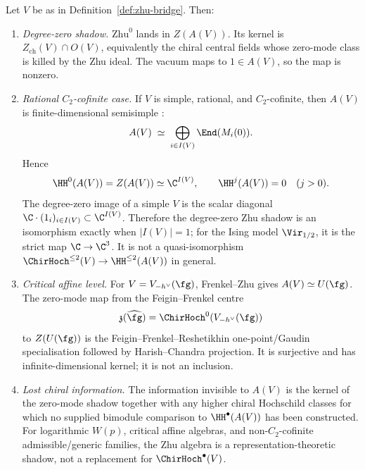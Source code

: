 \begin{proposition}%
\label{prop:zhu-hochschild-comparison}%
%
%
Let $V$ be as in Definition~\ref{def:zhu-bridge}. Then:
\begin{enumerate}
 \item[\textup{(i)}] \emph{Degree-zero shadow.}
 \(\mathrm{Zhu}^0\) lands in \(Z(A(V))\). Its kernel is
 \(Z_{\mathrm{ch}}(V)\cap O(V)\), equivalently the chiral central
 fields whose zero-mode class is killed by the Zhu ideal. The vacuum
 maps to \(1\in A(V)\), so the map is nonzero.
 \item[\textup{(ii)}] \emph{Rational \(C_2\)-cofinite case.}
 If \(V\) is simple, rational, and \(C_2\)-cofinite, then
 \(A(V)\) is finite-dimensional semisimple
 \cite{Zhu96,DLM98}:
 \[
 A(V)\;\simeq\;\bigoplus_{i\in I(V)}\End(M_i(0)).
 \]
 Hence
 \[
 \HH^0(A(V))=Z(A(V))\simeq \C^{I(V)},\qquad
 \HH^j(A(V))=0\quad(j>0).
 \]
 The degree-zero image of a simple \(V\) is the scalar diagonal
 \(\C\cdot(1_i)_{i\in I(V)}\subset \C^{I(V)}\). Therefore the
 degree-zero Zhu shadow is an isomorphism exactly when
 \(|I(V)|=1\); for the Ising model
 \(\Vir_{1/2}\), it is the strict map \(\C\to\C^3\). It is not a
 quasi-isomorphism \(\ChirHoch^{\le2}(V)\to\HH^{\le2}(A(V))\) in
 general.
 \item[\textup{(iii)}] \emph{Critical affine level.}
 For \(V=V_{-h^\vee}(\fg)\), Frenkel--Zhu gives
 \(A(V)\simeq U(\fg)\). The zero-mode map from the
 Feigin--Frenkel centre
 \[
 \mathfrak z(\widehat{\fg})=
 \ChirHoch^0(V_{-h^\vee}(\fg))
 \]
 to \(Z(U(\fg))\) is the Feigin--Frenkel--Reshetikhin
 one-point/Gaudin specialisation followed by Harish--Chandra
 projection. It is surjective and has infinite-dimensional kernel;
 it is not an inclusion.
 \item[\textup{(iv)}] \emph{Lost chiral information.}
 The information invisible to \(A(V)\) is the kernel of the zero-mode
 shadow together with any higher chiral Hochschild classes for which
 no supplied bimodule comparison to \(\HH^\bullet(A(V))\) has been
 constructed. For logarithmic \(W(p)\), critical affine algebras, and
 non-\(C_2\)-cofinite admissible/generic families, the Zhu algebra is
 a representation-theoretic shadow, not a replacement for
 \(\ChirHoch^\bullet(V)\).
\end{enumerate}
\end{proposition}

